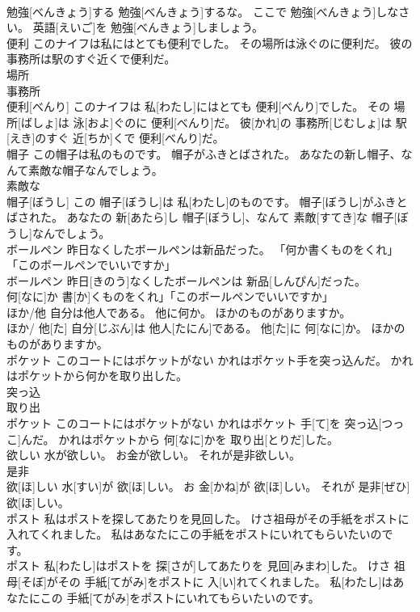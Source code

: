 \documentclass[8pt]{extreport}
\begin{document}
\begin{CJK}{UTF8}{min}
\\	勉強[べんきょう]する 勉強[べんきょう]するな。 ここで 勉強[べんきょう]しなさい。 英語[えいご]を 勉強[べんきょう]しましょう。
\\	便利 このナイフは私にはとても便利でした。 その場所は泳ぐのに便利だ。 彼の事務所は駅のすぐ近くで便利だ。	
\\	場所 
\\	事務所 
\\	便利[べんり] このナイフは 私[わたし]にはとても 便利[べんり]でした。 その 場所[ばしょ]は 泳[およ]ぐのに 便利[べんり]だ。 彼[かれ]の 事務所[じむしょ]は 駅[えき]のすぐ 近[ちか]くで 便利[べんり]だ。
\\	帽子 この帽子は私のものです。 帽子がふきとばされた。 あなたの新し帽子、なんて素敵な帽子なんでしょう。	
\\	素敵な 
\\	帽子[ぼうし] この 帽子[ぼうし]は 私[わたし]のものです。 帽子[ぼうし]がふきとばされた。 あなたの 新[あたら]し 帽子[ぼうし]、なんて 素敵[すてき]な 帽子[ぼうし]なんでしょう。
\\	ボールペン 昨日なくしたボールペンは新品だった。 「何か書くものをくれ」「このボールペンでいいですか」	
\\	ボールペン 昨日[きのう]なくしたボールペンは 新品[しんぴん]だった。 
\\	何[なに]か 書[か]くものをくれ」「このボールペンでいいですか」
\\	ほか/他 自分は他人である。 他に何か。 ほかのものがありますか。	
\\	ほか/ 他[た] 自分[じぶん]は 他人[たにん]である。 他[た]に 何[なに]か。 ほかのものがありますか。
\\	ポケット このコートにはポケットがない かれはポケット手を突っ込んだ。 かれはポケットから何かを取り出した。	
\\	突っ込 
\\	取り出 
\\	ポケット このコートにはポケットがない かれはポケット 手[て]を 突っ込[つっこ]んだ。 かれはポケットから 何[なに]かを 取り出[とりだ]した。
\\	欲しい 水が欲しい。 お金が欲しい。 それが是非欲しい。	
\\	是非 
\\	欲[ほ]しい 水[すい]が 欲[ほ]しい。 お 金[かね]が 欲[ほ]しい。 それが 是非[ぜひ] 欲[ほ]しい。
\\	ポスト 私はポストを探してあたりを見回した。 けさ祖母がその手紙をポストに入れてくれました。 私はあなたにこの手紙をポストにいれてもらいたいのです。	
\\	ポスト 私[わたし]はポストを 探[さが]してあたりを 見回[みまわ]した。 けさ 祖母[そぼ]がその 手紙[てがみ]をポストに 入[い]れてくれました。 私[わたし]はあなたにこの 手紙[てがみ]をポストにいれてもらいたいのです。

\end{CJK}
\end{document}
